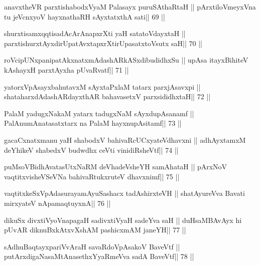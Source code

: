 \begin{shl}
anavxtheVR parxtishabodxV\s yaM Palasayx puruSAthaRtaH ||
pArxtiloVmeyxVna tu jeVcnxyoV hayxnathaRH sAyxtatxthA sati\hfill || 69 ||
\end{shl}

\begin{shl}
shurxtisamxqqtisadAcArAnapxrXti yaH satatoVdayxtaH ||
parxtishurxtAyxdirUpatAvxtapxrXtirUpasatxtoV\s sutx saH\hfill || 70 ||
\end{shl}

\begin{shl}
roVcipUNxpanipatAkxnatxmAdashARkASxdibudidhxSu ||
upAsa itayxBihiteV kAshayxH parxtAyxha pUvaRvatf\hfill || 71 ||
\end{shl}

\begin{shl}
yatorxVpAsayxbahutavxM sAyxtaPxlaM tatarx parxjAsavxpi ||
shataharxdAdashARdayxthAR bahavasetxV parxsididhxtaH\hfill || 72 ||
\end{shl}

\begin{shl}
PalaM yadugxNakaM yatarx tadugxNaM sAyxdupAsanamf ||
PalAnumAnatasatxtarx na PalaM hayxnupAsitamf\hfill || 73 ||
\end{shl}

\begin{shl}
gacaCxnatxmanu yaH shabodxV bahivaRcUCxyateV\s dhavxni ||
adhAyxtamxM deYhikeV shabedxV budwdhx ceVti vinidiRsheVtf\hfill || 74 ||
\end{shl}

\begin{shl}
puMsoV\s BidhAvatasUtxNaRM deVhadeVsheYH samAhataH ||
pArxNoV vaqtitxvisheVSeVNa bahivaRtukxruteV dhavxnimf\hfill || 75 ||
\end{shl}

\begin{shl}
vaqtitxkeSxVpAdasurayamAyuSashacx tadAshirxteVH ||
shatAyureVva Bavati mirxyateV nApamaqtuyxnA\hfill || 76 ||
\end{shl}

\begin{shl}
dikuSx divxtiVyoV\s napagaH sadivxtiVyaH sadeYva saH ||
duHsaMBAvAyx hi pUvAR diknuBxkAtxvX\s\s shAM pashicxmAM janeYH\hfill || 77 ||
\end{shl}

\begin{shl}
sAdhuBaqtayxpariVvAraH savaRdoVpAsakoV BaveVtf ||
putArxdigaNasaMtAnasethxYyaRmeVva sadA BaveVtf\hfill || 78 ||
\end{shl}

